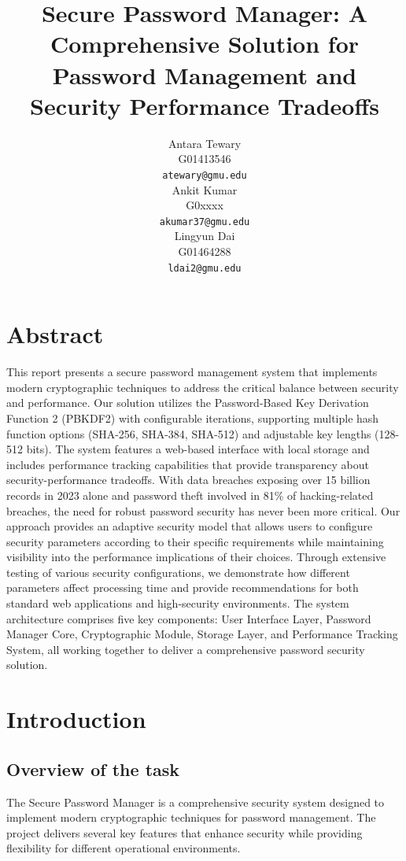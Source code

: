 \documentclass[11pt,a4paper]{article}
\title{Secure Password Manager: A Comprehensive Solution for Password Management and Security Performance Tradeoffs}
\author{Antara Tewary \\
  G01413546 \\
  \texttt{atewary@gmu.edu} \\\And
  Ankit Kumar\\
  G0xxxx\\
  \texttt{akumar37@gmu.edu} \\\And 
  Lingyun Dai\\ 
  G01464288\\ 
  \texttt{ldai2@gmu.edu} \\}
\date{}
\begin{document}
\maketitle
\section{Abstract}
This report presents a secure password management system that implements modern cryptographic techniques to address the critical balance between security and performance. Our solution utilizes the Password-Based Key Derivation Function 2 (PBKDF2) with configurable iterations, supporting multiple hash function options (SHA-256, SHA-384, SHA-512) and adjustable key lengths (128-512 bits). The system features a web-based interface with local storage and includes performance tracking capabilities that provide transparency about security-performance tradeoffs.
With data breaches exposing over 15 billion records in 2023 alone and password theft involved in 81\% of hacking-related breaches, the need for robust password security has never been more critical. Our approach provides an adaptive security model that allows users to configure security parameters according to their specific requirements while maintaining visibility into the performance implications of their choices. Through extensive testing of various security configurations, we demonstrate how different parameters affect processing time and provide recommendations for both standard web applications and high-security environments. The system architecture comprises five key components: User Interface Layer, Password Manager Core, Cryptographic Module, Storage Layer, and Performance Tracking System, all working together to deliver a comprehensive password security solution.
\section{Introduction}

            \subsection{Overview of the task}
            The Secure Password Manager is a comprehensive security system designed to implement modern cryptographic techniques for password management. The project delivers several key features that enhance security while providing flexibility for different operational environments. 
            
\end{document}
